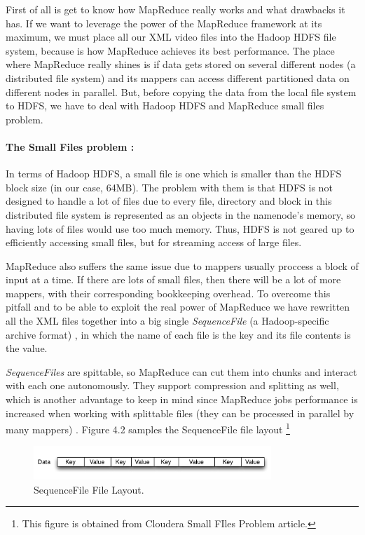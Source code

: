 First of all is get to know how MapReduce really works and what drawbacks it has. If we want to leverage the power of the MapReduce framework at its maximum, we must place all our XML video files into the Hadoop HDFS file system, because is how MapReduce achieves its best performance. The place where MapReduce really shines is if data gets stored on several different nodes (a distributed file system) and its mappers can access different partitioned data on different nodes in parallel. But, before copying the data from the local file system to HDFS, we have to deal with Hadoop HDFS and MapReduce small files problem.

\paragraph{The Small Files problem \cite{liu2009implementing}:} In terms of Hadoop HDFS, a small file is one which is smaller than the HDFS block size (in our case, 64MB). The problem with them is that HDFS is not designed to handle a lot of files due to every file, directory and block in this distributed file system is represented as an objects in the namenode's memory, so having lots of files would use too much memory. Thus, HDFS is not geared up to efficiently accessing small files, but for streaming access of large files. 
\par
MapReduce also suffers the same issue due to mappers usually proccess a block of input at a time. If there are lots of small files, then there will be a lot of more mappers, with their corresponding bookkeeping overhead. To overcome this pitfall and to be able to exploit the real power of MapReduce we have rewritten all the XML files together into a big single \textit{SequenceFile} (a Hadoop-specific archive format) \cite{ApacheHadoopSequenceFile}, in which the name of each file is the key and its file contents is the value. 
\par
\textit{SequenceFiles} are spittable, so MapReduce can cut them into chunks and interact with each one autonomously. They support compression and splitting as well, which is another advantage to keep in mind since MapReduce jobs performance is increased when working with splittable files (they can be processed in parallel by many mappers)  \cite{SmallFiles}. Figure 4.2 samples the SequenceFile file layout \footnote{This figure is obtained from Cloudera Small FIles Problem article.}

\begin{figure}[htb]
\centering
\includegraphics[width=0.8\textwidth]{./images/sequencefile.png}
\caption{SequenceFile File Layout.} \label{fig:sequencefile}
\end{figure}


